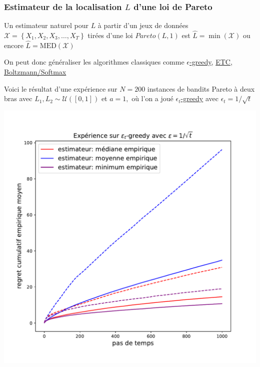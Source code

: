 \documentclass[8pt, sans]{beamer}
\begin{document}
\begin{frame}
\frametitle{Estimateur de la localisation $L$ d'une loi de Pareto}
Un estimateur naturel pour $L$ à partir d'un jeux de données $\mathcal{X}=\left\{X_1,X_2,X_3,\ldots,X_T\right\}$ tirées d'une loi $Pareto(L,1)$ est $\widehat{L}=\min(\mathcal{X})$ ou encore $\widehat{L}=\mathrm{MED}(\mathcal{X})$

\pause
\vfill

On peut donc généraliser les algorithmes classiques comme \underline{$\epsilon$-greedy}, \underline{ETC}, \underline{Boltzmann/Softmax}
  
\pause
\vfill

Voici le résultat d'une expérience sur $N=200$ instances de bandits Pareto à deux bras avec $L_1, L_2\sim\mathcal{U}([0,1])$ et $a=1,$ où l'on a joué \underline{$\epsilon_t$-greedy} avec $\epsilon_t=1/\sqrt{t}$

\vfill

\begin{center}
\includegraphics[scale=0.3]{exp-Pareto.pdf}
\end{center}

\end{frame}
                          
\end{document}
